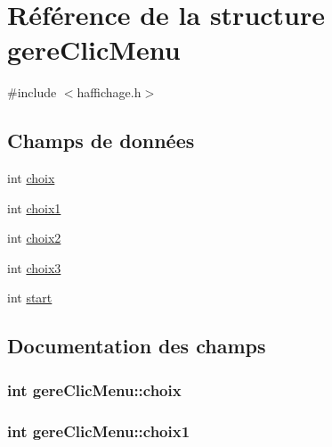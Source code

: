 \hypertarget{structgere_clic_menu}{}\section{Référence de la structure gere\+Clic\+Menu}
\label{structgere_clic_menu}


{\ttfamily \#include $<$haffichage.\+h$>$}

\subsection*{Champs de données}
\begin{DoxyCompactItemize}
\item 
int \hyperlink{structgere_clic_menu_a19816b3ed7f02217c56df721b5aa6f53}{choix}
\item 
int \hyperlink{structgere_clic_menu_adf17c483ab54d455271483c9ad3d4204}{choix1}
\item 
int \hyperlink{structgere_clic_menu_a8d7e49218199a1e5727244bb54a6ea74}{choix2}
\item 
int \hyperlink{structgere_clic_menu_a66206c4eca6d59ab569ec9a6cb6349fb}{choix3}
\item 
int \hyperlink{structgere_clic_menu_a25e04719e259bfc4a4219eb8532d10a3}{start}
\end{DoxyCompactItemize}


\subsection{Documentation des champs}
\subsubsection[{\texorpdfstring{choix}{choix}}]{\setlength{\rightskip}{0pt plus 5cm}int gere\+Clic\+Menu\+::choix}\hypertarget{structgere_clic_menu_a19816b3ed7f02217c56df721b5aa6f53}{}\label{structgere_clic_menu_a19816b3ed7f02217c56df721b5aa6f53}
\subsubsection[{\texorpdfstring{choix1}{choix1}}]{\setlength{\rightskip}{0pt plus 5cm}int gere\+Clic\+Menu\+::choix1}\hypertarget{structgere_clic_menu_adf17c483ab54d455271483c9ad3d4204}{}\label{structgere_clic_menu_adf17c483ab54d455271483c9ad3d4204}
